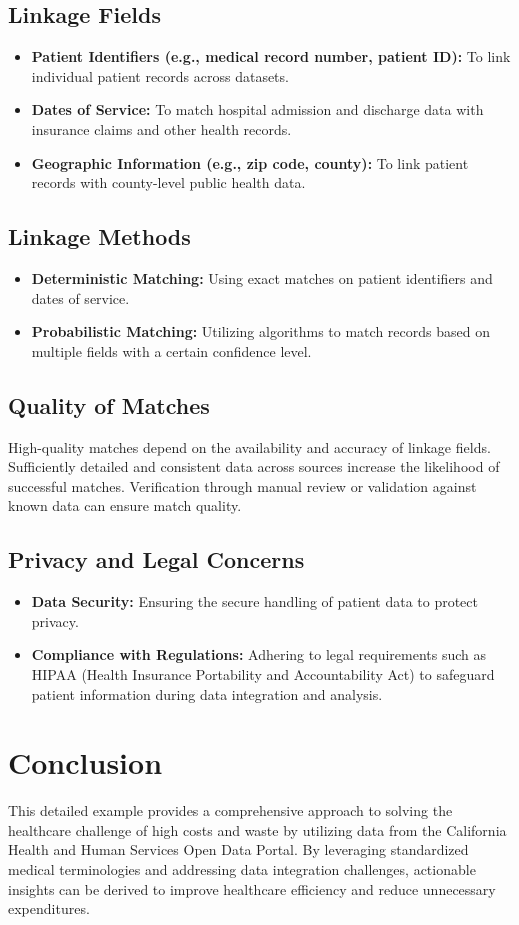 \documentclass{article}
\begin{document}
\subsection*{Linkage Fields}
\begin{itemize}
    \item \textbf{Patient Identifiers (e.g., medical record number, patient ID):} To link individual patient records across datasets.
    \item \textbf{Dates of Service:} To match hospital admission and discharge data with insurance claims and other health records.
    \item \textbf{Geographic Information (e.g., zip code, county):} To link patient records with county-level public health data.
\end{itemize}

\subsection*{Linkage Methods}
\begin{itemize}
    \item \textbf{Deterministic Matching:} Using exact matches on patient identifiers and dates of service.
    \item \textbf{Probabilistic Matching:} Utilizing algorithms to match records based on multiple fields with a certain confidence level.
\end{itemize}

\subsection*{Quality of Matches}
High-quality matches depend on the availability and accuracy of linkage fields. Sufficiently detailed and consistent data across sources increase the likelihood of successful matches. Verification through manual review or validation against known data can ensure match quality.

\subsection*{Privacy and Legal Concerns}
\begin{itemize}
    \item \textbf{Data Security:} Ensuring the secure handling of patient data to protect privacy.
    \item \textbf{Compliance with Regulations:} Adhering to legal requirements such as HIPAA (Health Insurance Portability and Accountability Act) to safeguard patient information during data integration and analysis.
\end{itemize}

\section*{Conclusion}
This detailed example provides a comprehensive approach to solving the healthcare challenge of high costs and waste by utilizing data from the California Health and Human Services Open Data Portal. By leveraging standardized medical terminologies and addressing data integration challenges, actionable insights can be derived to improve healthcare efficiency and reduce unnecessary expenditures.
\end{document}
